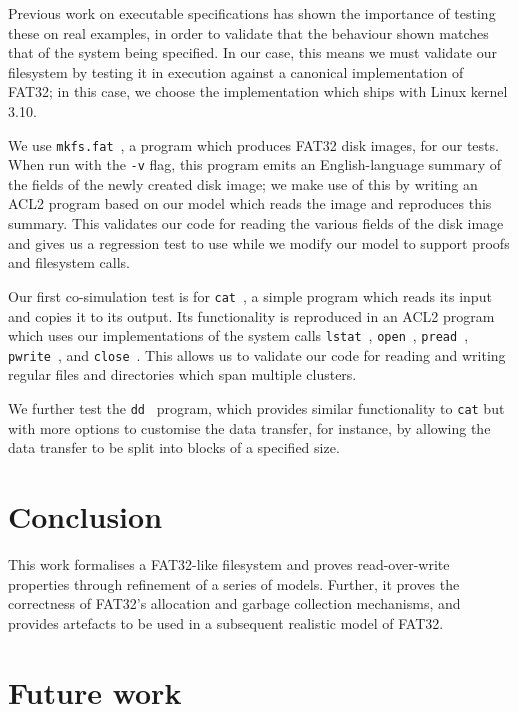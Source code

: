 \documentclass[submission,copyright,creativecommons]{eptcs}
\begin{document}
Previous work on executable specifications \cite{goel2014simulation}
has shown the importance of testing these on real examples, in order
to validate that the behaviour shown matches that of the system being
specified. In our case, this means we must validate our filesystem by
testing it in execution against a canonical implementation of FAT32;
in this case, we choose the implementation which ships with Linux
kernel 3.10.

We use \texttt{mkfs.fat}~\cite{hudsonmkfs}, a program which produces
FAT32 disk images, for our tests. When run with the \texttt{-v} flag,
this program emits an English-language summary of the fields of the
newly created disk image; we make use of this by writing an ACL2
program based on our model which reads the image and reproduces this
summary. This validates our code for reading the various fields of the
disk image and gives us a regression test to use while we modify our
model to support proofs and filesystem calls.

Our first co-simulation test is for \texttt{cat}~\cite{granlundcat}, a
simple program which reads its input and copies it to its output. Its
functionality is reproduced in an ACL2 program which uses our
implementations of the system calls
\texttt{lstat}~\cite{kerrisklstat},
\texttt{open}~\cite{kerriskopen}, \texttt{pread}~\cite{kerriskpread},
\texttt{pwrite}~\cite{kerriskpwrite}, and
\texttt{close}~\cite{kerriskclose}. This allows us to validate our
code for reading and writing regular files and directories which span
multiple clusters.

We further test the \texttt{dd}~\cite{rubindd} program, which provides
similar functionality to \texttt{cat} but with more options to
customise the data transfer, for instance, by allowing the data
transfer to be split into blocks of a specified size.

\section{Conclusion}

This work formalises a FAT32-like filesystem and proves
read-over-write properties through refinement of a series of
models. Further, it proves the correctness of FAT32's allocation and
garbage collection mechanisms, and provides artefacts to be used in a
subsequent realistic model of FAT32.

\section{Future work}
\end{document}
